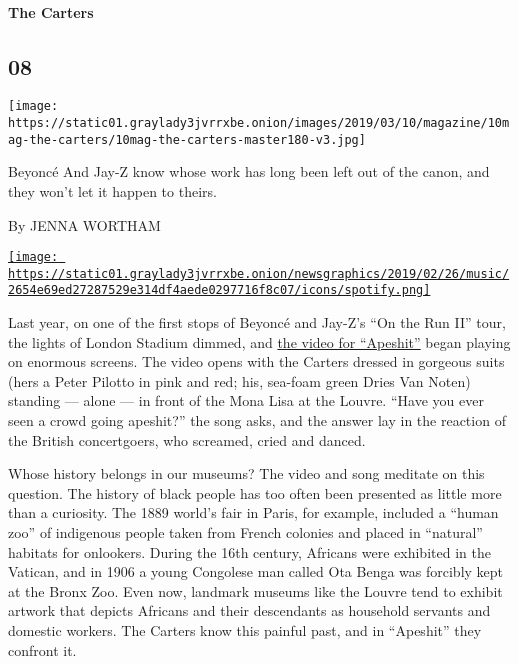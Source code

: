 \hypertarget{the-carters}{%
\paragraph{The Carters}\label{the-carters}}

\hypertarget{08}{%
\subsection{08}\label{08}}

\texttt{[image: https://static01.graylady3jvrrxbe.onion/images/2019/03/10/magazine/10mag-the-carters/10mag-the-carters-master180-v3.jpg]}

Beyoncé And Jay-Z know whose work has long been left out of the canon,
and they won't let it happen to theirs.

By JENNA WORTHAM

\href{https://open.spotify.com/track/0E6PsO3ymCfUh7pJQjBgkj}{\texttt{[image: https://static01.graylady3jvrrxbe.onion/newsgraphics/2019/02/26/music/2654e69ed27287529e314df4aede0297716f8c07/icons/spotify.png]}}

Last year, on one of the first stops of Beyoncé and Jay-Z's ``On the Run
II'' tour, the lights of London Stadium dimmed, and
\href{https://www.youtube.com/watch?v=kbMqWXnpXcA}{the video for
``Apeshit''} began playing on enormous screens. The video opens with the
Carters dressed in gorgeous suits (hers a Peter Pilotto in pink and red;
his, sea-foam green Dries Van Noten) standing --- alone --- in front of
the Mona Lisa at the Louvre. ``Have you ever seen a crowd going
apeshit?'' the song asks, and the answer lay in the reaction of the
British concertgoers, who screamed, cried and danced.

Whose history belongs in our museums? The video and song meditate on
this question. The history of black people has too often been presented
as little more than a curiosity. The 1889 world's fair in Paris, for
example, included a ``human zoo'' of indigenous people taken from French
colonies and placed in ``natural'' habitats for onlookers. During the
16th century, Africans were exhibited in the Vatican, and in 1906 a
young Congolese man called Ota Benga was forcibly kept at the Bronx Zoo.
Even now, landmark museums like the Louvre tend to exhibit artwork that
depicts Africans and their descendants as household servants and
domestic workers. The Carters know this painful past, and in ``Apeshit''
they confront it.

